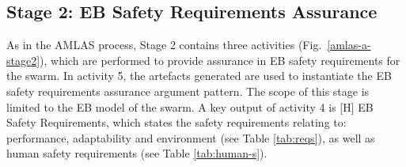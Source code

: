 \documentclass[runningheads]{llncs}
\begin{document}
\subsection{Stage 2: EB Safety Requirements Assurance} \label{framework-stage2}
As in the AMLAS process, Stage 2 contains three activities (Fig.~\ref{amlas-a-stage2}), which are performed to provide assurance in EB safety requirements for the swarm. 
In activity 5, the artefacts generated are used to instantiate the EB safety requirements assurance argument pattern. The scope of this stage is limited to the EB model of the swarm.
A key output of activity 4 is [H] EB Safety Requirements, which states the safety requirements relating to: performance, adaptability and environment (see Table \ref{tab:reqs}), as well as human safety requirements (see Table \ref{tab:human-s}).

\end{document}
